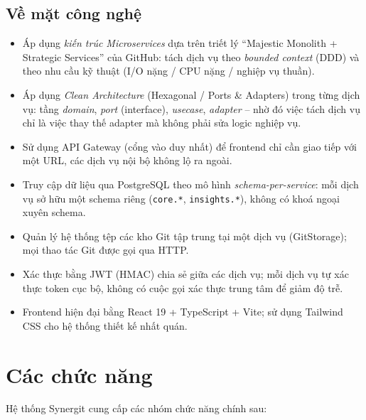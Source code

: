 \subsection{Về mặt công nghệ}
\begin{itemize}
\item Áp dụng \textit{kiến trúc Microservices} dựa trên triết lý ``Majestic Monolith + Strategic Services'' của GitHub: tách dịch vụ theo \textit{bounded context} (DDD) và theo nhu cầu kỹ thuật (I/O nặng / CPU nặng / nghiệp vụ thuần).
\item Áp dụng \textit{Clean Architecture} (Hexagonal / Ports \& Adapters) trong từng dịch vụ: tầng \textit{domain}, \textit{port} (interface), \textit{usecase}, \textit{adapter} -- nhờ đó việc tách dịch vụ chỉ là việc thay thế adapter mà không phải sửa logic nghiệp vụ.
\item Sử dụng API Gateway (cổng vào duy nhất) để frontend chỉ cần giao tiếp với một URL, các dịch vụ nội bộ không lộ ra ngoài.
\item Truy cập dữ liệu qua PostgreSQL theo mô hình \textit{schema-per-service}: mỗi dịch vụ sở hữu một schema riêng (\texttt{core.*}, \texttt{insights.*}), không có khoá ngoại xuyên schema.
\item Quản lý hệ thống tệp các kho Git tập trung tại một dịch vụ (GitStorage); mọi thao tác Git được gọi qua HTTP.
\item Xác thực bằng JWT (HMAC) chia sẻ giữa các dịch vụ; mỗi dịch vụ tự xác thực token cục bộ, không có cuộc gọi xác thực trung tâm để giảm độ trễ.
\item Frontend hiện đại bằng React 19 + TypeScript + Vite; sử dụng Tailwind CSS cho hệ thống thiết kế nhất quán.
\end{itemize}

\section{Các chức năng}
Hệ thống Synergit cung cấp các nhóm chức năng chính sau:


